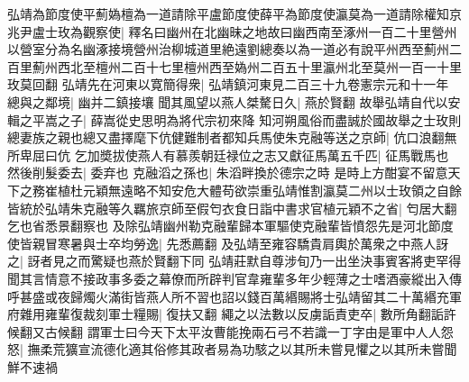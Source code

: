 弘靖為節度使平薊媯檀為一道請除平盧節度使薛平為節度使瀛莫為一道請除權知京兆尹盧士玫為觀察使|{
	釋名曰幽州在北幽昧之地故曰幽西南至涿州一百二十里營州以營室分為名幽涿接境營州治柳城道里絶遠劉總奏以為一道必有說平州西至薊州二百里薊州西北至檀州二百十七里檀州西至媯州二百五十里瀛州北至莫州一百一十里玫莫回翻}
弘靖先在河東以寛簡得衆|{
	弘靖鎮河東見二百三十九卷憲宗元和十一年}
總與之鄰境|{
	幽并二鎮接壤}
聞其風望以燕人桀驁日久|{
	燕於賢翻}
故舉弘靖自代以安輯之平嵩之子|{
	薛嵩從史思明為將代宗初來降}
知河朔風俗而盡誠於國故舉之士玫則總妻族之親也總又盡擇麾下伉健難制者都知兵馬使朱克融等送之京師|{
	伉口浪翻無所卑屈曰伉}
乞加奬拔使燕人有慕羨朝廷禄位之志又獻征馬萬五千匹|{
	征馬戰馬也}
然後削髮委去|{
	委弃也}
克融滔之孫也|{
	朱滔畔換於德宗之時}
是時上方酣宴不留意天下之務崔植杜元穎無遠略不知安危大體苟欲崇重弘靖惟割瀛莫二州以士玫領之自餘皆統於弘靖朱克融等久羈旅京師至假匄衣食日詣中書求官植元穎不之省|{
	匄居大翻乞也省悉景翻察也}
及除弘靖幽州勒克融輩歸本軍驅使克融輩皆憤怨先是河北節度使皆親冒寒暑與士卒均勞逸|{
	先悉薦翻}
及弘靖至雍容驕貴肩輿於萬衆之中燕人訝之|{
	訝者見之而驚疑也燕於賢翻下同}
弘靖莊默自尊涉旬乃一出坐決事賓客將吏罕得聞其言情意不接政事多委之幕僚而所辟判官韋雍輩多年少輕薄之士嗜酒豪縱出入傳呼甚盛或夜歸燭火滿街皆燕人所不習也詔以錢百萬緡賜將士弘靖留其二十萬緡充軍府雜用雍輩復裁刻軍士糧賜|{
	復扶又翻}
繩之以法數以反虜詬責吏卒|{
	數所角翻詬許候翻又古候翻}
謂軍士曰今天下太平汝曹能挽兩石弓不若識一丁字由是軍中人人怨怒|{
	撫柔荒獷宣流德化適其俗修其政者易為功駭之以其所未嘗見懼之以其所未嘗聞鮮不速禍}



